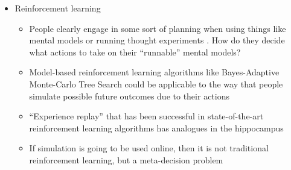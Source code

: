\documentclass[12pt]{article}
\begin{document}
\begin{itemize}
\item Reinforcement learning
    \begin{itemize}
    \item People clearly engage in some sort of planning when using things like mental models \citep{Gentner1983} or running thought experiments \citep{Gendler1998}. How do they decide what actions to take on their ``runnable'' mental models?
    \item Model-based reinforcement learning algorithms like Bayes-Adaptive Monte-Carlo Tree Search could be applicable to the way that people simulate possible future outcomes due to their actions \citep{Dearden1999,Ross2008,Browne2012,Guez2013}
    \item ``Experience replay'' that has been successful in state-of-the-art reinforcement learning algorithms has analogues in the hippocampus \citep{Mnih2015}
    \item If simulation is going to be used online, then it is not traditional reinforcement learning, but a meta-decision problem \citep{Hay2012}
    \end{itemize}

\end{itemize}

\end{document}
